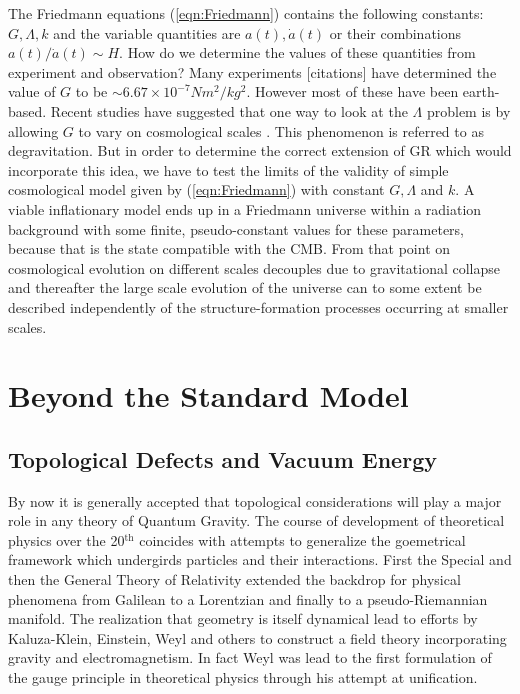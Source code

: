\documentclass[11pt,english,rmp]{revtex4}
\begin{document}
The Friedmann equations (\ref{eqn:Friedmann}) contains the following
constants: $G,\Lambda,k$ and the variable quantities are $a(t),\dot{a}(t)$
or their combinations $a(t)/\dot{a}(t)\sim H$. How do we determine
the values of these quantities from experiment and observation? Many
experiments {[}citations{]} have determined the value of $G$ to be
$\sim6.67\times10^{-7}Nm^{2}/kg^{2}$. However most of these have
been earth-based. Recent studies have suggested that one way to look
at the $\Lambda$ problem is by allowing $G$ to vary on cosmological
scales \cite{Dvali2007Degravitation}. This phenomenon is referred to as degravitation. But in order to determine the correct extension of GR which
would incorporate this idea, we have to test the limits of the validity
of simple cosmological model given by (\ref{eqn:Friedmann}) with
constant $G,\Lambda$ and $k$. A viable inflationary model ends up
in a Friedmann universe within a radiation background with some finite,
pseudo-constant values for these parameters, because that is the state
compatible with the CMB. From that point on cosmological evolution
on different scales decouples due to gravitational collapse and thereafter
the large scale evolution of the universe can to some extent be described
independently of the structure-formation processes occurring at smaller
scales.


\section{Beyond the Standard Model}


\subsection{Topological Defects and Vacuum Energy}

By now it is generally accepted that topological considerations will
play a major role in any theory of Quantum Gravity. The course of
development of theoretical physics over the 20$^{\text{th}}$ coincides
with attempts to generalize the goemetrical framework which undergirds
particles and their interactions. First the Special and then the General
Theory of Relativity extended the backdrop for physical phenomena
from Galilean to a Lorentzian and finally to a pseudo-Riemannian manifold.
The realization that geometry is itself dynamical lead to efforts
by Kaluza-Klein, Einstein, Weyl and others to construct a field theory
incorporating gravity and electromagnetism. In fact Weyl was lead
to the first formulation of the gauge principle in theoretical physics
through his attempt at unification.
\end{document}

